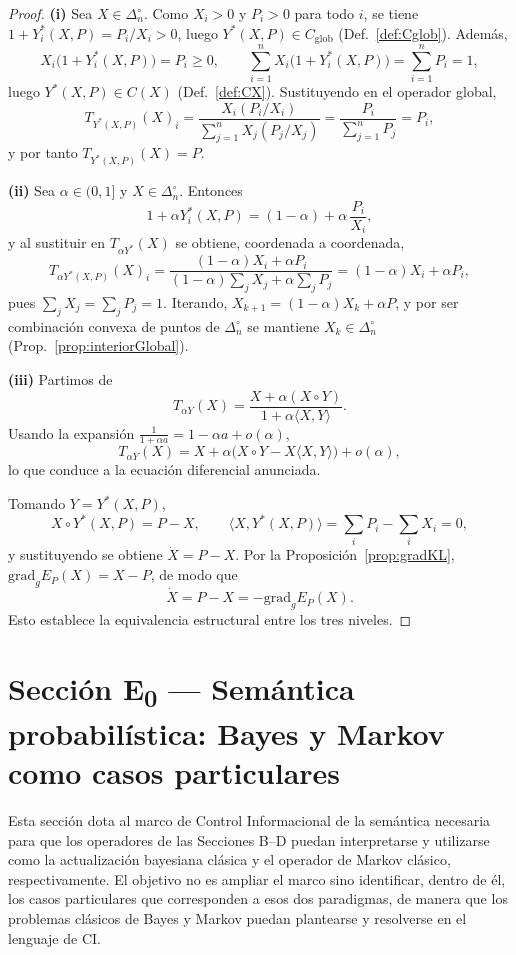 ﻿\documentclass[12pt]{article}
\begin{document}
\begin{proof}
\noindent\textbf{(i)} Sea $X\in\Delta_n^\circ$. Como $X_i>0$ y $P_i>0$ para todo $i$,
se tiene $1+Y^*_i(X,P)=P_i/X_i>0$, luego $Y^*(X,P)\in C_{\mathrm{glob}}$
(Def.~\ref{def:Cglob}). Además,
\[
X_i\bigl(1+Y^*_i(X,P)\bigr)=P_i\ge 0,
\qquad
\sum_{i=1}^n X_i\bigl(1+Y^*_i(X,P)\bigr)=\sum_{i=1}^n P_i=1,
\]
luego $Y^*(X,P)\in C(X)$ (Def.~\ref{def:CX}). Sustituyendo en el operador global,
\[
T_{Y^*(X,P)}(X)_i
=
\frac{X_i(P_i/X_i)}{\sum_{j=1}^n X_j(P_j/X_j)}
=
\frac{P_i}{\sum_{j=1}^n P_j}
=
P_i,
\]
y por tanto $T_{Y^*(X,P)}(X)=P$.

\smallskip
\noindent\textbf{(ii)} Sea $\alpha\in(0,1]$ y $X\in\Delta_n^\circ$. Entonces
\[
1+\alpha Y^*_i(X,P)
=
(1-\alpha)+\alpha\,\frac{P_i}{X_i},
\]
y al sustituir en $T_{\alpha Y^*}(X)$ se obtiene, coordenada a coordenada,
\[
T_{\alpha Y^*(X,P)}(X)_i
=
\frac{(1-\alpha)X_i+\alpha P_i}{(1-\alpha)\sum_{j}X_j+\alpha\sum_{j}P_j}
=
(1-\alpha)X_i+\alpha P_i,
\]
pues $\sum_j X_j=\sum_j P_j=1$. Iterando, $X_{k+1}=(1-\alpha)X_k+\alpha P$, y por
ser combinación convexa de puntos de $\Delta_n^\circ$ se mantiene
$X_k\in\Delta_n^\circ$ (Prop.~\ref{prop:interiorGlobal}).

\smallskip
\noindent\textbf{(iii)} Partimos de
\[
T_{\alpha Y}(X)
=
\frac{X+\alpha(X\circ Y)}{1+\alpha\langle X,Y\rangle}.
\]
Usando la expansión $\frac{1}{1+\alpha a}=1-\alpha a+o(\alpha)$,
\[
T_{\alpha Y}(X)
=
X+\alpha\bigl(X\circ Y-X\langle X,Y\rangle\bigr)+o(\alpha),
\]
lo que conduce a la ecuación diferencial anunciada.

Tomando $Y=Y^*(X,P)$,
\[
X\circ Y^*(X,P)=P-X,
\qquad
\langle X,Y^*(X,P)\rangle=\sum_i P_i-\sum_i X_i=0,
\]
y sustituyendo se obtiene $\dot X=P-X$. Por la
Proposición~\ref{prop:gradKL}, $\mathrm{grad}_g E_P(X)=X-P$, de modo que
\[
\dot X=P-X=-\mathrm{grad}_g E_P(X).
\]
Esto establece la equivalencia estructural entre los tres niveles.
\end{proof}


\section{Sección E\textsubscript{0} — Semántica probabilística: Bayes y Markov como casos particulares}

Esta sección dota al marco de Control Informacional de la semántica necesaria para que los operadores de las Secciones B--D puedan interpretarse y utilizarse como la actualización bayesiana clásica y el operador de Markov clásico, respectivamente. El objetivo no es ampliar el marco sino identificar, dentro de él, los casos particulares que corresponden a esos dos paradigmas, de manera que los problemas clásicos de Bayes y Markov puedan plantearse y resolverse en el lenguaje de CI.
\end{document}
